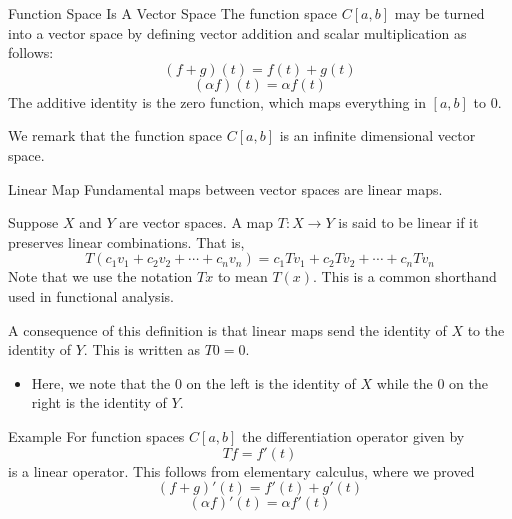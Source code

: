 \documentclass[10pt]{beamer}
\begin{document}
		\begin{frame}{Function Space Is A Vector Space}
				The function space $C[a,b]$ may be turned into a vector space by defining vector addition and scalar multiplication as follows: 
				\begin{equation*}
						(f+g)(t) = f(t) + g(t) 
				\end{equation*}
				\begin{equation*}
						(\alpha f)(t) = \alpha f(t)
				\end{equation*}
				The additive identity is the zero function, which maps everything in $[a,b]$ to 0. 

				\begin{block}{}
						We remark that the function space $C[a,b]$ is an infinite dimensional vector space. 
				\end{block}
		\end{frame}

		\begin{frame}{Linear Map}
				Fundamental maps between vector spaces are linear maps. 
				\begin{definition}
						Suppose $X$ and $Y$ are vector spaces. A map $T: X\to Y$ is said to be \alert{linear} if it preserves linear combinations. That is, 
						\begin{equation*}
								T(c_1v_1 + c_2v_2 + \cdots + c_nv_n) = c_1Tv_1 + c_2Tv_2 + \cdots + c_nTv_n
						\end{equation*}
						Note that we use the notation $Tx$ to mean $T(x)$. This is a common shorthand used in functional analysis.
				\end{definition}
				A consequence of this definition is that linear maps send the identity of $X$ to the identity of $Y$. This is written as $T0 = 0$. 
				\begin{itemize}
						\item Here, we note that the $0$ on the left is the identity of $X$ while the $0$ on the right is the identity of $Y$. 
				\end{itemize}
		\end{frame}

		\begin{frame}{Example}
				For function spaces $C[a,b]$ the differentiation operator given by 
				\begin{equation*}
						Tf = f'(t)
				\end{equation*}
				is a linear operator. This follows from elementary calculus, where we proved 
				\begin{equation*}
						(f+g)'(t) = f'(t) + g'(t) 
				\end{equation*}
				\begin{equation*}
						(\alpha f)'(t) = \alpha f'(t)
				\end{equation*}
		\end{frame}
\end{document}
